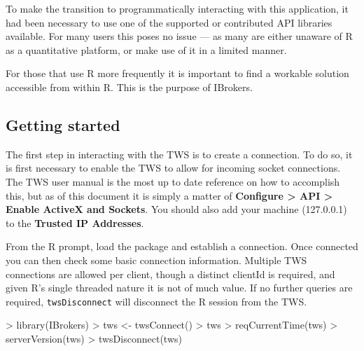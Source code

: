 \documentclass{article}
\begin{document}
To make the transition to programmatically interacting
with this application, it had been necessary to use
one of the supported or contributed API libraries
available. For many users this poses no issue --- as many
are either unaware of R as a quantitative platform, or
make use of it in a limited manner.

For those that use R more frequently it is important
to find a workable solution accessible from within
R.  This is the purpose of IBrokers.

\subsection{Getting started}
The first step in interacting with the TWS is to
create a connection.  To do so, it is first
necessary to enable the TWS to allow for
incoming socket connections. The TWS
user manual is the most up to date reference on
how to accomplish this, but as of this document
it is simply a matter of \textbf{Configure > API > Enable ActiveX and Sockets}.
You should also add your machine (127.0.0.1) to the \textbf{Trusted IP Addresses}.

From the R prompt, load the package and establish a
connection. Once connected you can then check some basic connection information.
Multiple TWS connections are allowed per client, though a distinct
clientId is required, and given R's single threaded nature it is not
of much value.
If no further queries are required, {\tt twsDisconnect} will disconnect
the R session from the TWS.
\begin{Schunk}
\begin{Sinput}
> library(IBrokers)
> tws <- twsConnect()
> tws
> reqCurrentTime(tws)
> serverVersion(tws)
> twsDisconnect(tws)
\end{Sinput}
\end{Schunk}
\end{document}
